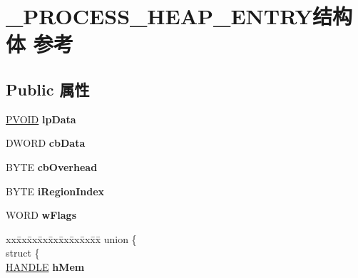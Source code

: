 \hypertarget{struct___p_r_o_c_e_s_s___h_e_a_p___e_n_t_r_y}{}\section{\+\_\+\+P\+R\+O\+C\+E\+S\+S\+\_\+\+H\+E\+A\+P\+\_\+\+E\+N\+T\+R\+Y结构体 参考}
\label{struct___p_r_o_c_e_s_s___h_e_a_p___e_n_t_r_y}
\subsection*{Public 属性}
\begin{DoxyCompactItemize}
\item 
\mbox{\label{struct___p_r_o_c_e_s_s___h_e_a_p___e_n_t_r_y_a5909394c078e7e1fc5af7c4bc2ac16ce}} 
\hyperlink{interfacevoid}{P\+V\+O\+ID} {\bfseries lp\+Data}
\item 
\mbox{\label{struct___p_r_o_c_e_s_s___h_e_a_p___e_n_t_r_y_af9f9d1e330e747b5c2b354e4cb1626a4}} 
D\+W\+O\+RD {\bfseries cb\+Data}
\item 
\mbox{\label{struct___p_r_o_c_e_s_s___h_e_a_p___e_n_t_r_y_abe354d7e664b2273cd33ec5639b78316}} 
B\+Y\+TE {\bfseries cb\+Overhead}
\item 
\mbox{\label{struct___p_r_o_c_e_s_s___h_e_a_p___e_n_t_r_y_ad49ffd8ae9e30b8904366463aeccdcac}} 
B\+Y\+TE {\bfseries i\+Region\+Index}
\item 
\mbox{\label{struct___p_r_o_c_e_s_s___h_e_a_p___e_n_t_r_y_a5665575260c70ac5383ac1359bc74e45}} 
W\+O\+RD {\bfseries w\+Flags}
\item 
\mbox{\label{struct___p_r_o_c_e_s_s___h_e_a_p___e_n_t_r_y_a4684c3ce266a1ba0a0897c5113fcef52}} 
\begin{tabbing}
xx\=xx\=xx\=xx\=xx\=xx\=xx\=xx\=xx\=\kill
union \{\\
\>struct \{\\
\>\>\hyperlink{interfacevoid}{HANDLE} {\bfseries hMem}\\

\end{tabbing}
\end{DoxyCompactItemize}
